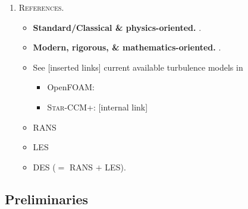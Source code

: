 \documentclass{book}
\numberwithin{equation}{section}
\begin{document}
\begin{enumerate}
\begin{enumerate}
        \textsc{References.}
        \begin{itemize}
            \item \textbf{Heuristic \& rigorous.} \cite[Chap. 11: Systems of Conservation Laws]{Evans2010}.
            \item \cite{Lax1987}.
        \end{itemize}
        \item {}
        \item {}
        \item {}\footnote{Also, steady-state/time-independent vs. unsteady-state/time-dependent/evolution.}
        \item {}
        \item {}
        \item {} $\to$ PDEs in chemistry.
    \end{enumerate}
    \item {}
    
    \textsc{References.}
    \begin{itemize}
        \item \textbf{Standard/Classical \& physics-oriented.} \cite{Pope2000}.
        \item \textbf{Modern, rigorous, \& mathematics-oriented.} \cite{Rebollo_Lewandowski2014}.
        \item See [inserted links] current available turbulence models in
        \begin{itemize}
            \item OpenFOAM: 
            \item \textsc{Star-CCM+}: [internal link]
        \end{itemize}
    \end{itemize}
    \begin{itemize}
        \item RANS
        \item LES
        \item DES ($=$ RANS $+$ LES).
    \end{itemize}
\end{enumerate}

\subsection{Preliminaries}
\end{document}
